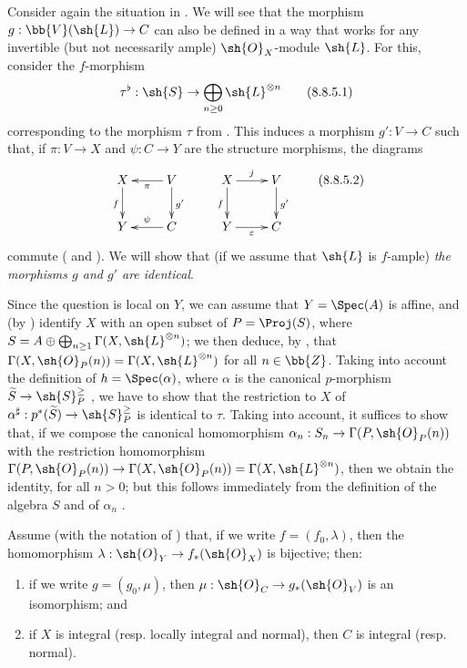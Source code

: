 \begin{env}[8.8.5]
\label{II.8.8.5}
Consider again the situation in .
We will see that the morphism $g:\bb{V}(\sh{L})\to C$ can also be defined in a way that works for any invertible (but not necessarily ample) $\sh{O}_X$-module $\sh{L}$.
For this, consider the $f$-morphism
\[
\label{II.8.8.5.1}
  \tau^\flat:\sh{S}\to\bigoplus_{n\geq0}\sh{L}^{\otimes n}
  \tag{8.8.5.1}
\]
corresponding to the morphism $\tau$ from .
This induces  a morphism $g':V\to C$ such that, if $\pi:V\to X$ and $\psi:C\to Y$ are the structure morphisms, the diagrams
\[
\label{II.8.8.5.2}
  \xymatrix{
    X
      \ar[d]_{f}
  & V
      \ar[l]^{\pi}
      \ar[d]^{g'}
  \\Y
  & C
      \ar[l]_{\psi}
  }
  \qquad
  \xymatrix{
    X
      \ar[r]^{j}
      \ar[d]_{f}
  & V
      \ar[d]^{g'}
  \\Y
      \ar[r]_{\varepsilon}
  & C
  }
\tag{8.8.5.2}
\]
commute ( and ).
We will show that (if we assume that $\sh{L}$ is $f$-ample) \emph{the morphisms $g$ and $g'$ are identical}.

Since the question is local on $Y$, we can assume that $Y=\Spec(A)$ is affine, and (by ) identify $X$ with an open subset of $P=\Proj(S)$, where $S=A\oplus\bigoplus_{n\geq1}\Gamma(X,\sh{L}^{\otimes n})$;
we then deduce, by , that $\Gamma(X,\sh{O}_P(n))=\Gamma(X,\sh{L}^{\otimes n})$ for all $n\in\bb{Z}$.
Taking into account the definition of $h=\Spec(\alpha)$, where $\alpha$ is the canonical $p$-morphism $\widetilde{S}\to\sh{S}_P^\geq$ , we have to show that the restriction to $X$ of $\alpha^\sharp:p^*(\widetilde{S})\to\sh{S}_P^\geq$ is identical to $\tau$.
Taking  into account, it suffices to show that, if we compose the canonical homomorphism $\alpha_n:S_n\to\Gamma(P,\sh{O}_P(n))$ with the restriction homomorphism $\Gamma(P,\sh{O}_P(n))\to\Gamma(X,\sh{O}_P(n))=\Gamma(X,\sh{L}^{\otimes n})$, then we obtain the identity, for all $n>0$;
but this follows immediately from the definition of the algebra $S$ and of $\alpha_n$ .
\end{env}

\begin{proposition}[8.8.6]
\label{II.8.8.6}
Assume (with the notation of ) that, if we write $f=(f_0,\lambda)$, then the homomorphism $\lambda:\sh{O}_Y\to f_*(\sh{O}_X)$ is bijective;
then:
\begin{enumerate}
  \item[\rm{(i)}] if we write $g=(g_0,\mu)$, then $\mu:\sh{O}_C\to g_*(\sh{O}_V)$ is an isomorphism; and
  \item[\rm{(ii)}] if $X$ is integral (resp. locally integral and normal), then $C$ is integral (resp. normal).
\end{enumerate}
\end{proposition}

